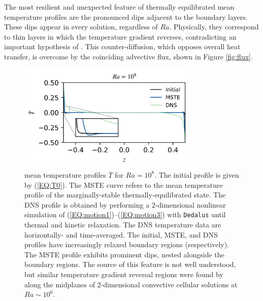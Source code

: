 \documentclass[reprint,amsmath,amssymb,aps]{revtex4-1}
\begin{document}
The most resilient and unexpected feature of thermally equilibrated mean temperature profiles are the pronounced dips adjacent to the boundary layers. 
These dips appear in every solution, regardless of $Ra$. 
Physically, they correspond to thin layers in which the temperature gradient reverses, contradicting an important hypothesis of \cite{Malkus_1954}. 
This counter-diffusion, which opposes overall heat transfer, is overcome by the coinciding advective flux, shown in Figure \ref{fig:flux}.  
\begin{figure}
    \centering
    \includegraphics[width=3.4in]{T_profs_na.png}
    \caption{mean temperature profiles $\bar{T}$ for $Ra = 10^8$. 
    The initial profile is given by (\ref{EQ:T0}). 
    The MSTE curve refers to the mean temperature profile of the marginally-stable thermally-equilibrated state. 
    The DNS profile is obtained by performing a 2-dimensional nonlinear simulation of (\ref{EQ:motion1})--(\ref{EQ:motion3}) with \texttt{Dedalus} until thermal and kinetic relaxation. 
    The DNS temperature data are horizontally- and time-averaged. 
    The initial, MSTE, and DNS profiles have increasingly relaxed boundary regions (respectively). 
    The MSTE profile exhibits prominent dips, nested alongside the boundary regions. 
    The source of this feature is not well understood, but similar temperature gradient reversal regions were found by \cite{chini_cells} along the midplanes of 2-dimensional convective cellular solutions at $Ra \sim 10^6$.}
    \label{fig:T0_profiles}
\end{figure}
\end{document}
